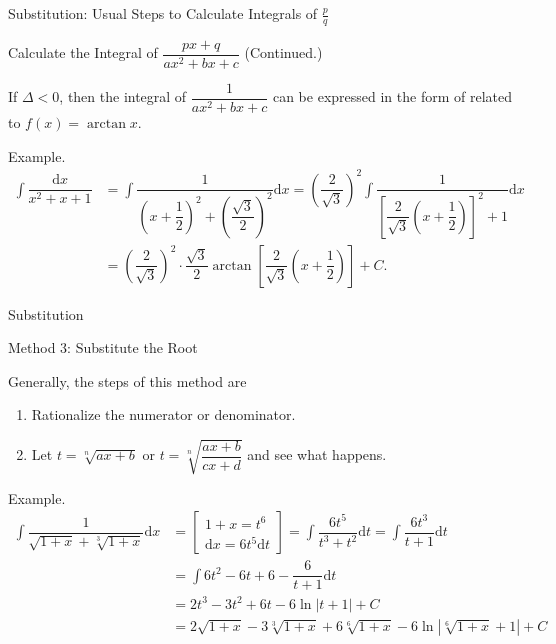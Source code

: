 \documentclass[aspectratio=169, UTF8]{ctexbeamer}
\begin{document}
    \begin{frame}[t]{Substitution: Usual Steps to Calculate Integrals of $\frac{p}{q}$}
        \begin{block}{Calculate the Integral of $\dfrac{px+q}{ax^{2}+bx+c}$ (Continued.)}
            \par If $\Delta< 0$, then the integral of $\dfrac{1}{ax^{2}+bx+c}$ can be expressed in the form of related to $f(x) = \arctan x$.
        \end{block}

        \par \textcolor{yy}{Example.}
        \begin{equation*}
            \begin{aligned}
                \int \dfrac{\mathrm{d} x}{x^{2}+x+1} &= \int \dfrac{1}{\left(x+\dfrac{1}{2}\right)^{2}+\left(\dfrac{\sqrt{3}}{2}\right)^{2}} \mathrm{d} x = \left(\dfrac{2}{\sqrt{3}}\right)^{2} \int \dfrac{1}{\left[\dfrac{2}{\sqrt{3}}\left(x+\dfrac{1}{2}\right)\right]^{2}+1}\mathrm{d}x \\
                &=\left(\dfrac{2}{\sqrt{3}}\right)^{2} \cdot \dfrac{\sqrt{3}}{2} \arctan \left[\dfrac{2}{\sqrt{3}}\left(x+\dfrac{1}{2}\right)\right]+C.
            \end{aligned}
        \end{equation*}
    \end{frame}


    \begin{frame}[t]{Substitution}
        \begin{block}{Method 3: Substitute the Root}
            \par Generally, the steps of this method are
            \begin{enumerate}
                \item Rationalize the numerator or denominator.
                \item Let $t=\sqrt[n]{a x+b} \text { or } t=\sqrt[n]{\dfrac{a x+b}{c x+d}}$ and see what happens.
            \end{enumerate}
        \end{block}
        \textcolor{yy}{Example.} 
        \begin{equation*}
            \begin{aligned}
                \int \dfrac{1}{\sqrt{1+x}+\sqrt[3]{1+x}} \mathrm{d} x & = \left[\begin{array}{c} 1+x=t^6 \\ \mathrm{d}x=6t^5\mathrm{d}t \end{array}\right] =\int \dfrac{6t^5}{t^3+t^2}\mathrm{d}t =\int\dfrac{6t^3}{t+1}\mathrm{d}t \\
                & =\int 6t^2-6t+6-\dfrac{6}{t+1}\mathrm{d}t\\
                & =2t^3-3t^2+6t-6\ln \left|t+1\right|+C\\
                & =2 \sqrt{1+x}-3 \sqrt[3]{1+x}+6 \sqrt[6]{1+x}-6 \ln |\sqrt[6]{1+x}+1|+C
            \end{aligned}
        \end{equation*}
    \end{frame}
\end{document}
